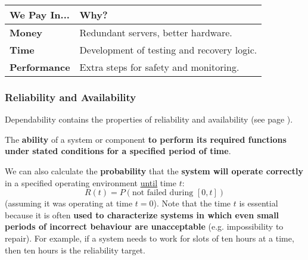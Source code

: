 \begin{table}[!htp]
    \centering
    \begin{tabular}{@{} l l @{}}
        \toprule
        We Pay In... & Why? \\
        \midrule
        \textbf{Money}          & Redundant servers, better hardware. \\ [.3em]
        \textbf{Time}           & Development of testing and recovery logic. \\ [.3em]
        \textbf{Performance}    & Extra steps for safety and monitoring. \\
        \bottomrule
    \end{tabular}
\end{table}

\newpage

\subsubsection{Reliability and Availability}

Dependability contains the properties of reliability and availability (see page \pageref{subsubsection: introduction - dependability}).

\highspace
\begin{definitionbox}[: Reliability]
    The \textbf{ability} of a system or component \textbf{to perform its required functions under stated conditions for a specified period of time}.
\end{definitionbox}

\highspace
We can also calculate the \textbf{probability} that the \textbf{system will operate correctly} in a specified operating environment \underline{until} time $t$:
\begin{equation}\label{eq: reliability probability}
    R\left(t\right) = P\left(\text{not failed during } \left[0,t\right]\right)
\end{equation}
(assuming it was operating at time $t=0$). Note that the time $t$ is essential because it is often \textbf{used to characterize systems in which even small periods of incorrect behaviour are unacceptable} (e.g. impossibility to repair). For example, if a system needs to work for slots of ten hours at a time, then ten hours is the reliability target.


